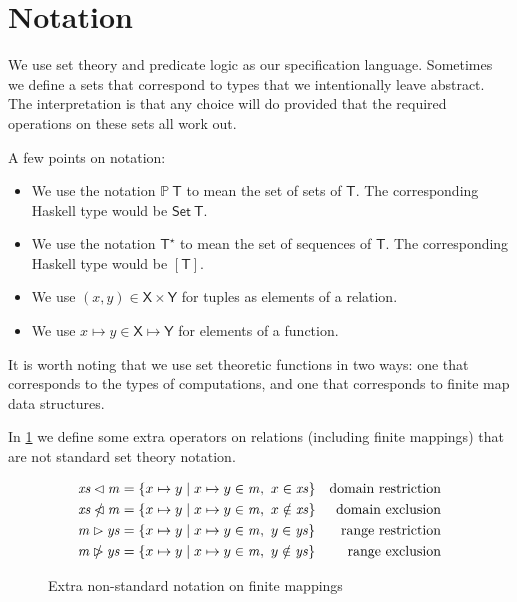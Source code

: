 \documentclass[11pt,a4paper]{article}
\newcommand{\powerset}[1]{\mathbb{P}~#1}
\newcommand{\sequencetype}[1]{#1^\star}
\newcommand{\restrictdom}{\lhd}
\newcommand{\subtractdom}{\mathbin{\slashed{\restrictdom}}}
\newcommand{\restrictrange}{\rhd}
\newcommand{\subtractrange}{\mathbin{\slashed{\restrictrange}}}
\newcommand{\var}[1]{\mathit{#1}}
\newcommand{\type}[1]{\mathsf{#1}}
\begin{document}
\section{Notation}

We use set theory and predicate logic as our specification language.
Sometimes we define a sets that correspond to types that we intentionally
leave abstract. The interpretation is that any choice will do provided that
the required operations on these sets all work out.

A few points on notation:
\begin{itemize}
\item We use the notation $\powerset{\type{T}}$ to mean the set of sets of
      $\type{T}$. The corresponding Haskell type would be
      $\type{Set} ~ \type{T}$.
\item We use the notation $\sequencetype{\type{T}}$ to mean the set of
      sequences of $\type{T}$. The corresponding Haskell type would
      be $[\type{T}]$.
\item We use $(x,y) \in \type{X} \times \type{Y}$ for tuples as elements of a
      relation.
\item We use $x \mapsto y \in \type{X} \mapsto \type{Y}$ for elements of a
      function.
\end{itemize}
%
It is worth noting that we use set theoretic functions in two ways: one
that corresponds to the types of computations, and one that corresponds to
finite map data structures.

In \cref{fig:notation} we define some extra operators on relations (including
finite mappings) that are not standard set theory notation.

\begin{figure}
\begin{align*}
  \var{xs} \restrictdom \var{m}
& = \{ x \mapsto y \mid x \mapsto y \in \var{m}, ~ x \in \var{xs} \}
& \text{domain restriction}
\\
  \var{xs} \subtractdom \var{m}
& = \{ x \mapsto y \mid x \mapsto y \in \var{m}, ~ x \notin \var{xs} \}
& \text{domain exclusion}
\\
  \var{m} \restrictrange \var{ys}
& = \{ x \mapsto y \mid x \mapsto y \in \var{m}, ~ y \in \var{ys} \}
& \text{range restriction}
\\
  \var{m} \subtractrange \var{ys}
& = \{ x \mapsto y \mid x \mapsto y \in \var{m}, ~ y \notin \var{ys} \}
& \text{range exclusion}
\end{align*}
\caption{Extra non-standard notation on finite mappings}
\label{fig:notation}
\end{figure}
\end{document}
